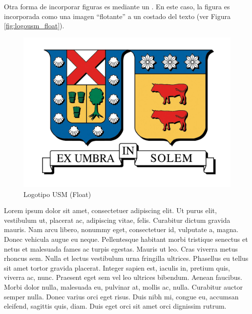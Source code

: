 Otra forma de incorporar figuras es mediante un . En este caso, la figura es incorporada como una imagen ``flotante'' a un costado del texto  (ver Figura \autoref{fig:logousm_float}).

\begin{figure}
    \vspace{-20pt}
    \begin{spacing}{1}
        \begin{center}
            \includegraphics[width=.35\columnwidth]{figures/logousm.png}
            \vspace{-10pt}
            \caption{Logotipo USM (Float)}
            \label{fig:logousm_float}
        \end{center}
    \end{spacing}
    \vspace{-10pt}
\end{figure}

Lorem ipsum dolor sit amet, consectetuer adipiscing elit. Ut purus elit, vestibulum ut, placerat ac, adipiscing vitae, felis. Curabitur dictum gravida mauris. Nam arcu libero, nonummy eget, consectetuer id, vulputate a, magna. Donec vehicula augue eu neque. Pellentesque habitant morbi tristique senectus et netus et malesuada fames ac turpis egestas. Mauris ut leo. Cras viverra metus rhoncus sem. Nulla et lectus vestibulum urna fringilla ultrices. Phasellus eu tellus sit amet tortor gravida placerat. Integer sapien est, iaculis in, pretium quis, viverra ac, nunc. Praesent eget sem vel leo ultrices bibendum. Aenean faucibus. Morbi dolor nulla, malesuada eu, pulvinar at, mollis ac, nulla. Curabitur auctor semper nulla. Donec varius orci eget risus. Duis nibh mi, congue eu, accumsan eleifend, sagittis quis, diam. Duis eget orci sit amet orci dignissim rutrum.



